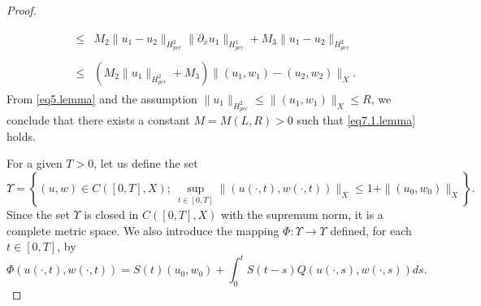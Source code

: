 \documentclass[12pt,reqno,a4paper]{amsart} %
\numberwithin{equation}{section}
\numberwithin{figure}{section}
\begin{document}
\begin{proof}
\begin{align}
\begin{array}{llll}
		\\\\ &\leq & M_2\|u_1-u_2  \|_{H_{per}^2} \|\partial_xu_1\|_{H_{per}^1} +M_3\|u_1-u_2  \|_{H_{per}^2} \\\\ &\leq  &( M_2\|u_1\|_{H_{per}^2} +M_3)\|(u_1,w_1)-(u_2, w_2)\|_X.\end{array}
	\end{align}From \eqref{eq5.lemma} and the assumption $\|u_1\|_{H_{per}^2}\leq \| (u_1, w_1)\|_{X}\leq R$, we conclude that there exists a constant $M=M(L,R)>0$ such that \eqref{eq7.1.lemma} holds. 
	
	For a given $T>0$, let us define the set
	\begin{equation}\label{eq8.lemma}  
		\Upsilon=\left\{(u,w)\in C([0,T], X);\ \sup_{t\in [0,T]}\|(u(\cdot,t), w(\cdot,t))\|_X\leq 1+\|(u_0, w_0)\|_X\right\}.
	\end{equation}
	Since the set $	\Upsilon$ is closed in $C([0,T],X)$ with the supremum norm, it is a complete metric space. We also introduce the mapping $\Phi: \Upsilon\rightarrow\Upsilon$ defined, for each $t\in [0,T]$, by
	\begin{equation}\label{eq9.lemma}  
		\Phi(u(\cdot,t), w(\cdot, t))=S(t)(u_0,w_0)+\int_{0}^{t}S(t-s)Q(u(\cdot,s),w(\cdot,s))ds.
	\end{equation}
	

\end{proof}
\end{document}
